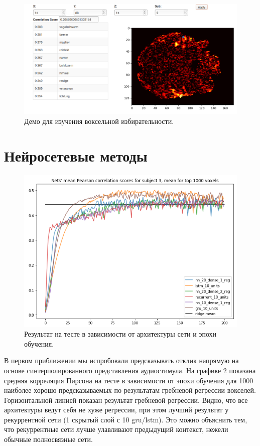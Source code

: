\documentclass[pdftex,ptm,12pt,a4paper]{report}
\theoremstyle{definition}
\begin{document}
\begin{figure}[h]
\centering
\includegraphics[scale=0.45]{images/demo.png}
\caption{Демо для изучения воксельной избирательности.}
\label{demo}
\end{figure}

\section{Нейросетевые методы}

\begin{figure}[h]
\centering
\includegraphics[scale=0.5]{graphics/sub3_net.png}
\caption{Результат на тесте в зависимости от архитектуры сети и эпохи обучения.}
\label{nets_scores}
\end{figure}

В первом приближении мы испробовали предсказывать отклик напрямую на основе синтерполированного представления аудиостимула. На графике \ref{nets_scores} показана средняя корреляция Пирсона на тесте в зависимости от эпохи обучения для 1000 наиболее хорошо предсказываемых по результатам гребневой регрессии вокселей. Горизонтальной линией показан результат гребневой регрессии. Видно, что все архитектуры ведут себя не хуже регрессии, при этом лучший результат у рекуррентной сети (1 скрытый слой с 10 gru/lstm). Это можно объяснить тем, что рекуррентные сети лучше улавливают предыдущий контекст, нежели обычные полносвязные сети.
\end{document}

